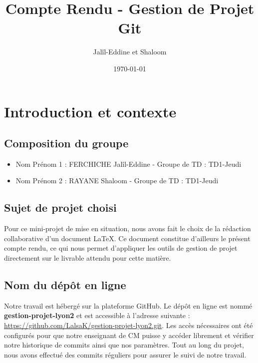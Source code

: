 \documentclass{article}
\title{Compte Rendu - Gestion de Projet Git}
\author{Jalîl-Eddine et Shaloom}
\date{\today}
\begin{document}
\maketitle

\section{Introduction et contexte}

\subsection*{Composition du groupe}

\begin{itemize}
    \item Nom Prénom 1 : FERCHICHE Jalîl-Eddine - Groupe de TD : TD1-Jeudi
    \item Nom Prénom 2 : RAYANE Shaloom - Groupe de TD : TD1-Jeudi
\end{itemize}

\subsection*{Sujet de projet choisi}
Pour ce mini-projet de mise en situation, nous avons fait le choix de la rédaction collaborative d'un document LaTeX. 
Ce document constitue d'ailleurs le présent compte rendu, ce qui nous permet d'appliquer les outils de gestion de projet directement sur le livrable attendu pour cette matière.

\subsection*{Nom du dépôt en ligne}
Notre travail est hébergé sur la plateforme GitHub. Le dépôt en ligne est nommé \textbf{gestion-projet-lyon2} et est accessible à l'adresse suivante : \url{https://github.com/LalsaK/gestion-projet-lyon2.git}. 
Les accès nécessaires ont été configurés pour que notre enseignant de CM puisse y accéder librement et vérifier notre historique de commits ainsi que nos paramètres.
Tout au long du projet, nous avons effectué des commits réguliers pour assurer le suivi de notre travail.
\end{document}
